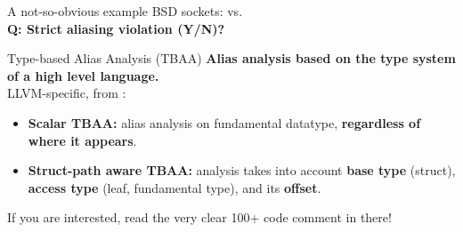 \begin{frame}{A not-so-obvious example}
  BSD sockets:  vs. \\[2em]
  \textbf{Q: Strict aliasing violation (Y/N)?} ~\facepalm

  \vfill
  
\end{frame}

\begin{frame}{Type-based Alias Analysis (TBAA)}
  \textbf{Alias analysis based on the type system of a high level language.}\\[1em]

  LLVM-specific, from :
  \begin{itemize}
  \item \textbf{Scalar TBAA:} alias analysis on fundamental datatype, \textbf{regardless of where it appears}.

  \item \textbf{Struct-path aware TBAA:} analysis takes into account \textbf{base type} (struct), \textbf{access type} (leaf, fundamental type), and its \textbf{offset}.
  \end{itemize}

  \vfill
  If you are interested, read the very clear 100+ code comment in there!
\end{frame}
